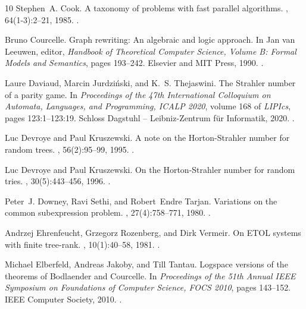 \documentclass[a4paper,UKenglish,cleveref, autoref, thm-restate, numberwithinsect]{lipics-v2021}
\begin{document}
\begin{thebibliography}{10}
Stephen~A. Cook.
\newblock A taxonomy of problems with fast parallel algorithms.
, 64(1-3):2--21, 1985.
\newblock \href {https://doi.org/10.1016/S0019-9958(85)80041-3}
  {}.

Bruno Courcelle.
\newblock Graph rewriting: An algebraic and logic approach.
\newblock In Jan van Leeuwen, editor, {\em Handbook of Theoretical Computer
  Science, Volume {B:} Formal Models and Semantics}, pages 193--242. Elsevier
  and {MIT} Press, 1990.
\newblock \href {https://doi.org/10.1016/B978-0-444-88074-1.50010-X}
  {}.

Laure Daviaud, Marcin Jurdzi\'{n}ski, and K.~S. Thejaswini.
\newblock The {Strahler} number of a parity game.
\newblock In {\em Proceedings of the 47th International Colloquium on Automata,
  Languages, and Programming, ICALP 2020}, volume 168 of {\em LIPIcs}, pages
  123:1--123:19. Schloss Dagstuhl -- Leibniz-Zentrum f{\"u}r Informatik, 2020.
\newblock \href {https://doi.org/10.4230/LIPIcs.ICALP.2020.123}
  {}.

Luc Devroye and Paul Kruszewski.
\newblock A note on the {Horton-Strahler} number for random trees.
, 56(2):95--99, 1995.
\newblock \href {https://doi.org/10.1016/0020-0190(95)00114-R}
  {}.

Luc Devroye and Paul Kruszewski.
\newblock On the {Horton-Strahler} number for random tries.
,
  30(5):443--456, 1996.
\newblock \href {https://doi.org/10.1051/ita/1996300504431}
  {}.

Peter~J. Downey, Ravi Sethi, and Robert~Endre Tarjan.
\newblock Variations on the common subexpression problem.
, 27(4):758--771, 1980.
\newblock \href {https://doi.org/10.1145/322217.322228}
  {}.

Andrzej Ehrenfeucht, Grzegorz Rozenberg, and Dirk Vermeir.
\newblock On {ETOL} systems with finite tree-rank.
, 10(1):40--58, 1981.
\newblock \href {https://doi.org/10.1137/0210004} {}.

Michael Elberfeld, Andreas Jakoby, and Till Tantau.
\newblock Logspace versions of the theorems of {Bodlaender} and {Courcelle}.
\newblock In {\em Proceedings of the 51th Annual {IEEE} Symposium on
  Foundations of Computer Science, {FOCS} 2010}, pages 143--152. {IEEE}
  Computer Society, 2010.
\newblock \href {https://doi.org/10.1109/FOCS.2010.21}
  {}.


\end{thebibliography}
\end{document}
